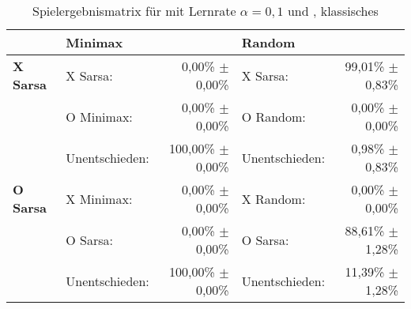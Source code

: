 \begin{table}
\centering
\caption[Spielergebnismatrix \sarsa: $\alpha=0,1$, \wtable, klassisches \splay]{Spielergebnismatrix für \sarsa mit Lernrate $\alpha=0,1$ und \wtable, klassisches \splay}
\label{tab:resultmatrix_sarsa_normal_alpha01_afterstate}

\begin{tabular}{llrlr}
\toprule
 & \multicolumn{2}{l}{\textbf{Minimax}} & \multicolumn{2}{l}{\textbf{Random}} \\ \midrule
\textbf{X Sarsa}        & X Sarsa:          & 0,00\% $\pm$    0,00\%            & X Sarsa:              & 99,01\% $\pm$ 0,83\%  \\
                        & O Minimax:        & 0,00\% $\pm$    0,00\%            & O Random:            & 0,00\% $\pm$ 0,00\%  \\
                        & Unentschieden:    & 100,00\% $\pm$  0,00\%            & Unentschieden:        & 0,98\% $\pm$ 0,83\%  \\ \cmidrule{2-5}
\textbf{O Sarsa}        & X Minimax:        & 0,00\% $\pm$    0,00\%            & X Random:             & 0,00\% $\pm$ 0,00\%  \\
                        & O Sarsa:          & 0,00\% $\pm$    0,00\%            & O Sarsa:              & 88,61\% $\pm$ 1,28\%  \\
                        & Unentschieden:    & 100,00\% $\pm$  0,00\%            & Unentschieden:        & 11,39\% $\pm$ 1,28\%  \\ \bottomrule
\end{tabular}
\end{table}